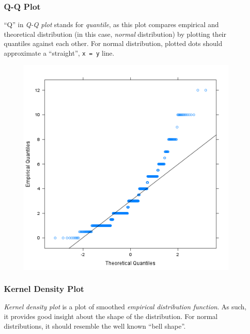 \documentclass[]{article}
\makeatletter
\def\maxwidth{\ifdim\Gin@nat@width>\linewidth\linewidth
\else\Gin@nat@width\fi}
\let\Oldincludegraphics\includegraphics
\renewcommand{\includegraphics}[1]{\Oldincludegraphics[width=\maxwidth]{#1}}
\makeatother
\begin{document}
\subsubsection{Q-Q Plot}

``Q'' in \emph{Q-Q plot} stands for \emph{quantile}, as this plot
compares empirical and theoretical distribution (in this case,
\emph{normal} distribution) by plotting their quantiles against each
other. For normal distribution, plotted dots should approximate a
``straight'', \texttt{x = y} line.

\begin{figure}[htbp]
\centering
\includegraphics{fff2bb7b8b095f881f85302d0128bae7.png}
\caption{}
\end{figure}

\subsubsection{Kernel Density Plot}

\emph{Kernel density plot} is a plot of smoothed \emph{empirical
distribution function}. As such, it provides good insight about the
shape of the distribution. For normal distributions, it should resemble
the well known ``bell shape''.
\end{document}
